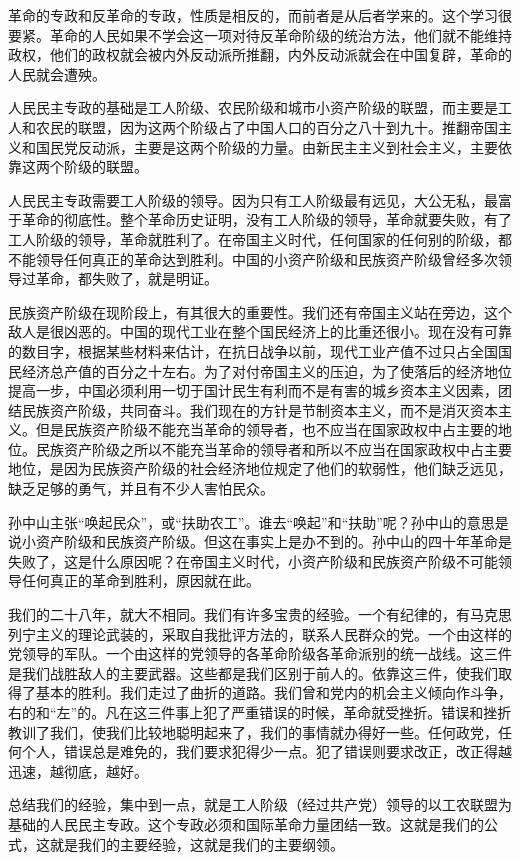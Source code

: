 \documentclass[UTF-8, a5paper, 12pt]{ctexart}
\begin{document}
革命的专政和反革命的专政，性质是相反的，而前者是从后者学来的。这个学习很要紧。革命的人民如果不学会这一项对待反革命阶级的统治方法，他们就不能维持政权，他们的政权就会被内外反动派所推翻，内外反动派就会在中国复辟，革命的人民就会遭殃。

人民民主专政的基础是工人阶级、农民阶级和城市小资产阶级的联盟，而主要是工人和农民的联盟，因为这两个阶级占了中国人口的百分之八十到九十。推翻帝国主义和国民党反动派，主要是这两个阶级的力量。由新民主主义到社会主义，主要依靠这两个阶级的联盟。

人民民主专政需要工人阶级的领导。因为只有工人阶级最有远见，大公无私，最富于革命的彻底性。整个革命历史证明，没有工人阶级的领导，革命就要失败，有了工人阶级的领导，革命就胜利了。在帝国主义时代，任何国家的任何别的阶级，都不能领导任何真正的革命达到胜利。中国的小资产阶级和民族资产阶级曾经多次领导过革命，都失败了，就是明证。

民族资产阶级在现阶段上，有其很大的重要性。我们还有帝国主义站在旁边，这个敌人是很凶恶的。中国的现代工业在整个国民经济上的比重还很小。现在没有可靠的数目字，根据某些材料来估计，在抗日战争以前，现代工业产值不过只占全国国民经济总产值的百分之十左右。为了对付帝国主义的压迫，为了使落后的经济地位提高一步，中国必须利用一切于国计民生有利而不是有害的城乡资本主义因素，团结民族资产阶级，共同奋斗。我们现在的方针是节制资本主义，而不是消灭资本主义。但是民族资产阶级不能充当革命的领导者，也不应当在国家政权中占主要的地位。民族资产阶级之所以不能充当革命的领导者和所以不应当在国家政权中占主要地位，是因为民族资产阶级的社会经济地位规定了他们的软弱性，他们缺乏远见，缺乏足够的勇气，并且有不少人害怕民众。

孙中山主张“唤起民众”，或“扶助农工”。谁去“唤起”和“扶助”呢？孙中山的意思是说小资产阶级和民族资产阶级。但这在事实上是办不到的。孙中山的四十年革命是失败了，这是什么原因呢？在帝国主义时代，小资产阶级和民族资产阶级不可能领导任何真正的革命到胜利，原因就在此。

我们的二十八年，就大不相同。我们有许多宝贵的经验。一个有纪律的，有马克思列宁主义的理论武装的，采取自我批评方法的，联系人民群众的党。一个由这样的党领导的军队。一个由这样的党领导的各革命阶级各革命派别的统一战线。这三件是我们战胜敌人的主要武器。这些都是我们区别于前人的。依靠这三件，使我们取得了基本的胜利。我们走过了曲折的道路。我们曾和党内的机会主义倾向作斗争，右的和“左”的。凡在这三件事上犯了严重错误的时候，革命就受挫折。错误和挫折教训了我们，使我们比较地聪明起来了，我们的事情就办得好一些。任何政党，任何个人，错误总是难免的，我们要求犯得少一点。犯了错误则要求改正，改正得越迅速，越彻底，越好。

总结我们的经验，集中到一点，就是工人阶级（经过共产党）领导的以工农联盟为基础的人民民主专政。这个专政必须和国际革命力量团结一致。这就是我们的公式，这就是我们的主要经验，这就是我们的主要纲领。
\end{document}
